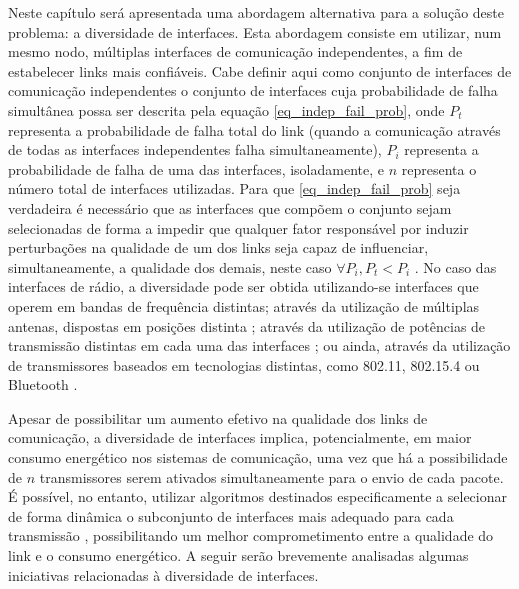 \documentclass[
	12pt,				%
	openright,			%
	oneside,
	a4paper,			%
	english,			%
	french,				%
	spanish,			%
	brazil				%
	]{abntex2}
\begin{document}
Neste capítulo será apresentada uma abordagem alternativa para a solução deste problema: a diversidade de interfaces. Esta abordagem consiste em utilizar, num mesmo nodo, múltiplas interfaces de comunicação independentes, a fim de estabelecer links mais confiáveis. Cabe definir aqui como conjunto de interfaces de comunicação independentes o conjunto de interfaces cuja probabilidade de falha simultânea possa ser descrita pela equação \ref{eq_indep_fail_prob}, onde $P_{t}$ representa a probabilidade de falha total do link (quando a comunicação através de todas as interfaces independentes falha simultaneamente), $P_{i}$ representa a probabilidade de falha de uma das interfaces, isoladamente, e $n$ representa o número total de interfaces utilizadas. Para que \ref{eq_indep_fail_prob} seja verdadeira é necessário que as interfaces que compõem o conjunto sejam selecionadas de forma a impedir que qualquer fator responsável por induzir perturbações na qualidade de um dos links seja capaz de influenciar, simultaneamente, a qualidade dos demais, neste caso $\forall P_{i}, P_{t} < P_{i}$ \cite{Jurdak2011, Kusy2011}. No caso das interfaces de rádio, a diversidade pode ser obtida utilizando-se interfaces que operem em bandas de frequência distintas; através da utilização de múltiplas antenas, dispostas em posições distinta \cite{Jurdak2011, Kusy2011}; através da utilização de potências de transmissão distintas em cada uma das interfaces \cite{Gummeson2010}; ou ainda, através da utilização de transmissores baseados em tecnologias distintas, como 802.11, 802.15.4 ou Bluetooth \cite{Lymberopoulos2008, Pering2006}.

Apesar de possibilitar um aumento efetivo na qualidade dos links de comunicação, a diversidade de interfaces implica, potencialmente, em maior consumo energético nos sistemas de comunicação, uma vez que há a possibilidade de $n$ transmissores serem ativados simultaneamente para o envio de cada pacote. É possível, no entanto, utilizar algoritmos destinados especificamente a selecionar de forma dinâmica o subconjunto de interfaces mais adequado para cada transmissão \cite{Gummeson2010, Lymberopoulos2008, Pering2006}, possibilitando um melhor comprometimento entre a qualidade do link e o consumo energético. A seguir serão brevemente analisadas algumas iniciativas relacionadas à diversidade de interfaces. 
\end{document}
